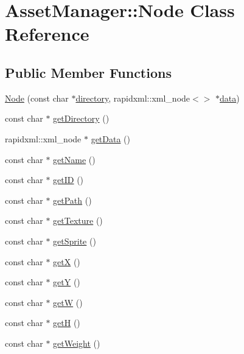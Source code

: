 \hypertarget{class_asset_manager_1_1_node}{}\section{Asset\+Manager\+:\+:Node Class Reference}
\label{class_asset_manager_1_1_node}
\subsection*{Public Member Functions}
\begin{DoxyCompactItemize}
\item 
\hyperlink{class_asset_manager_1_1_node_a4ae9e2e6a0b3c35d73d2c4feb00d75ee}{Node} (const char $\ast$\hyperlink{class_asset_manager_1_1_node_a26aef3543a3e17b4412ab227fca00ad6}{directory}, rapidxml\+::xml\+\_\+node$<$$>$ $\ast$\hyperlink{class_asset_manager_1_1_node_addfff47185d0626ec038163a7412fb5f}{data})
\item 
const char $\ast$ \hyperlink{class_asset_manager_1_1_node_ab9d425749d35be36f71d90b9c0129b6b}{get\+Directory} ()
\item 
rapidxml\+::xml\+\_\+node $\ast$ \hyperlink{class_asset_manager_1_1_node_a908a7d3bbf9b654ab9dc1a7c5cd1e686}{get\+Data} ()
\item 
const char $\ast$ \hyperlink{class_asset_manager_1_1_node_aa802aef36336348161712a68655fc3c5}{get\+Name} ()
\item 
const char $\ast$ \hyperlink{class_asset_manager_1_1_node_af51f879271556bc86f6a7204f184b4a1}{get\+ID} ()
\item 
const char $\ast$ \hyperlink{class_asset_manager_1_1_node_a47007b45af808b0aa80ec6edd2cd13ac}{get\+Path} ()
\item 
const char $\ast$ \hyperlink{class_asset_manager_1_1_node_a88542252e07d0cfac35e644e0ed819c3}{get\+Texture} ()
\item 
const char $\ast$ \hyperlink{class_asset_manager_1_1_node_a7040d86a2417512c672f58b49b02bdd1}{get\+Sprite} ()
\item 
const char $\ast$ \hyperlink{class_asset_manager_1_1_node_a8b09d3f05f9e77906819cbe486b4e9d4}{getX} ()
\item 
const char $\ast$ \hyperlink{class_asset_manager_1_1_node_a4661b08edcf7addf271c9339a3631a96}{getY} ()
\item 
const char $\ast$ \hyperlink{class_asset_manager_1_1_node_a5c501155379e2ad092b47d9a0746ba47}{getW} ()
\item 
const char $\ast$ \hyperlink{class_asset_manager_1_1_node_ac56609529e5f8ec86f5e2ed9e5789f8d}{getH} ()
\item 
const char $\ast$ \hyperlink{class_asset_manager_1_1_node_a06c2846c45c1ef864e5306ecfe08ae95}{get\+Weight} ()
\end{DoxyCompactItemize}

